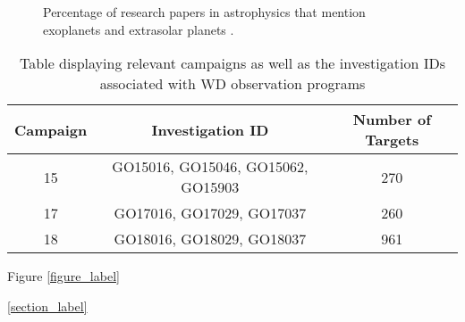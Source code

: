 
\begin{figure}[H]
\centering
{}
\caption{Percentage of research papers in astrophysics that mention exoplanets and extrasolar planets \citep[]{Yaqoob2012}. }
\label{label}
\end{figure}



\begin{table}[H]
\centerline{}
\smallskip
\centering
    \begin{tabular}{c c c}
    \hline
    \hline
    Campaign & Investigation ID & Number of Targets  \\ \hline
    15 & GO15016, GO15046, GO15062, GO15903 & 270 \\ 
    17 & GO17016, GO17029, GO17037 & 260 \\ 
    18 & GO18016, GO18029, GO18037 & 961 \\ \hline
    \end{tabular}
    \caption{Table displaying relevant campaigns as well as the investigation IDs associated with WD observation programs}
    \label{label}
\end{table}




\citep[]{ExoplanetArchive} %

\cite[]{Howell2014} %

Figure \ref{figure_label} %

\textsection \ref{section_label}  %




\noindent %
\newpage  %
